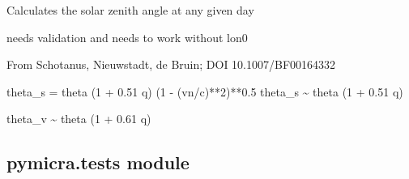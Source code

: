 \documentclass[a4paper,10pt,english]{sphinxmanual}
\begin{document}

\begin{fulllineitems}
\label{pymicra:pymicra.physics.solarZenith}
Calculates the solar zenith angle at any given day

needs validation and needs to work without lon0

\end{fulllineitems}


\begin{fulllineitems}
\label{pymicra:pymicra.physics.theta_from_theta_s}
From Schotanus, Nieuwstadt, de Bruin; DOI 10.1007/BF00164332

theta\_s = theta (1 + 0.51 q) (1 - (vn/c)**2)**0.5
theta\_s \textasciitilde{} theta (1 + 0.51 q)

\end{fulllineitems}


\begin{fulllineitems}
\label{pymicra:pymicra.physics.theta_from_theta_v}
theta\_v \textasciitilde{} theta (1 + 0.61 q)

\end{fulllineitems}


\begin{fulllineitems}
\label{pymicra:pymicra.physics.theta_std_from_theta_v_fluc}
\end{fulllineitems}



\subsection{pymicra.tests module}
\label{pymicra:pymicra-tests-module}\label{pymicra:module-pymicra.tests}
\end{document}
